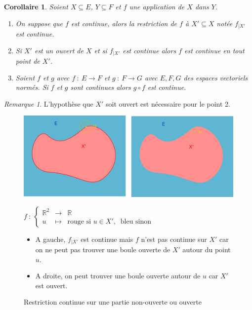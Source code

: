 \documentclass[]{article}
\newtheorem{mycor}{Corollaire}
\theoremstyle{remark}
\newtheorem{myrem}{Remarque}
\theoremstyle{definition}
\newcommand{\func}[5]{
#1 ~ : ~ \left\{ \begin{array}{lcl}
	#2 & \longrightarrow & #3 \\
	#4 & \longmapsto & #5
\end{array}
\right.
}
\newcommand{\funcshort}[3]{
#1 ~ : ~ #2 \longrightarrow #3
}
\begin{document}
\begin{mycor}
	Soient $X \subseteq E$, $Y \subseteq F$ et $f$ une application de $X$ dans $Y$.
	\begin{enumerate}
		\item On suppose que $f$ est continue, alors la restriction de $f$ à $X' \subseteq X$ notée $f_{|X'}$ est continue.
		
		\item Si $X'$ est un ouvert de $X$ et si $f_{|X'}$ est continue alors $f$ est continue en tout point de $X'$.
		
		\item Soient $f$ et $g$  avec $\funcshort{f}{E}{F}$ et $\funcshort{g}{F}{G}$ avec $E, F, G$ des espaces vectoriels normés. Si $f$ et $g$ sont continues alors $g \circ f$ est continue.
	\end{enumerate}
\end{mycor}

\newpage

\begin{myrem}
	L'hypothèse que $X'$ soit ouvert est nécessaire pour le point 2.
	\begin{figure}[h!]
		\centering
		\includegraphics[width=550pt]{Application_continue}
		\caption{Restriction continue sur une partie non-ouverte ou ouverte}
		
		$\func{f}{\mathbb{R}^2}{\mathbb{R}}{u}{\text{rouge si } u \in X', ~ \text{ bleu sinon}}$
		
		\begin{itemize}
		\item A gauche, $f_{|X'}$ est continue mais $f$ n'est pas continue sur $X'$ car on ne peut pas trouver une boule ouverte de $X'$ autour du point $u$.
		
		\item A droite, on peut trouver une boule ouverte autour de $u$ car $X'$ est ouvert.
		\end{itemize}
	\end{figure}
\end{myrem}
\end{document}
